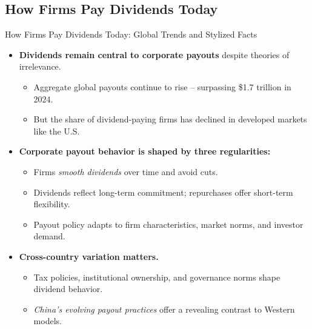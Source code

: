 \subsection{How Firms Pay Dividends Today}
\begin{frame}{How Firms Pay Dividends Today: Global Trends and Stylized Facts}
\footnotesize
\begin{itemize}
    \item \textbf{Dividends remain central to corporate payouts} despite theories of irrelevance.
    \begin{itemize}
        \item Aggregate global payouts continue to rise -- surpassing \$1.7 trillion in 2024.
        \item But the share of dividend-paying firms has declined in developed markets like the U.S.
    \end{itemize}
    \item \textbf{Corporate payout behavior is shaped by three regularities:}
    \begin{itemize}
        \item Firms \textit{smooth dividends} over time and avoid cuts.
        \item Dividends reflect long-term commitment; repurchases offer short-term flexibility.
        \item Payout policy adapts to firm characteristics, market norms, and investor demand.
    \end{itemize}
    \item \textbf{Cross-country variation matters.}
    \begin{itemize}
        \item Tax policies, institutional ownership, and governance norms shape dividend behavior.
        \item \textit{China's evolving payout practices} offer a revealing contrast to Western models.
    \end{itemize}
\end{itemize}
\end{frame}


